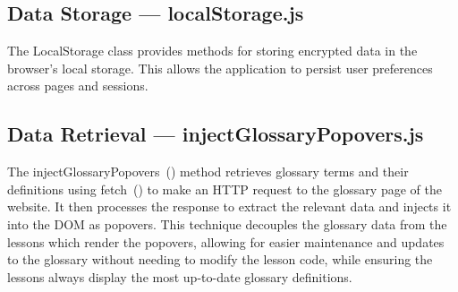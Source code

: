 \subsection*{Data Storage --- localStorage.js}
The LocalStorage class provides methods for storing encrypted data in the browser's local storage. This allows the application to persist user preferences across pages and sessions.

\subsection*{Data Retrieval --- injectGlossaryPopovers.js}
The injectGlossaryPopovers~() method retrieves glossary terms and their definitions using fetch~() to make an HTTP request to the glossary page of the website. It then processes the response to extract the relevant data and injects it into the DOM as popovers. This technique decouples the glossary data from the lessons which render the popovers, allowing for easier maintenance and updates to the glossary without needing to modify the lesson code, while ensuring the lessons always display the most up-to-date glossary definitions.
